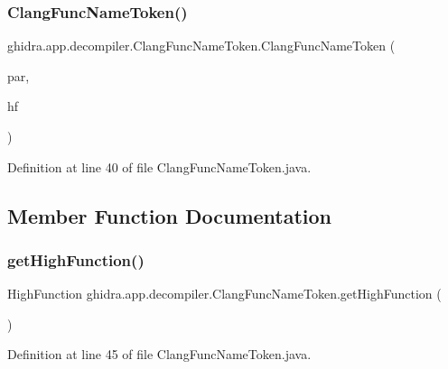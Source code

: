 \subsubsection{\texorpdfstring{ClangFuncNameToken()}{ClangFuncNameToken()}}
{\footnotesize\ttfamily ghidra.\+app.\+decompiler.\+Clang\+Func\+Name\+Token.\+Clang\+Func\+Name\+Token (\begin{DoxyParamCaption}\item[{\mbox{\hyperlink{interfaceghidra_1_1app_1_1decompiler_1_1_clang_node}{Clang\+Node}}}]{par,  }\item[{High\+Function}]{hf }\end{DoxyParamCaption})\hspace{0.3cm}{\ttfamily [inline]}}



Definition at line 40 of file Clang\+Func\+Name\+Token.\+java.



\subsection{Member Function Documentation}
\mbox{\label{classghidra_1_1app_1_1decompiler_1_1_clang_func_name_token_ab33ddfc24363949886b22462187de7d0}} 
\subsubsection{\texorpdfstring{getHighFunction()}{getHighFunction()}}
{\footnotesize\ttfamily High\+Function ghidra.\+app.\+decompiler.\+Clang\+Func\+Name\+Token.\+get\+High\+Function (\begin{DoxyParamCaption}{ }\end{DoxyParamCaption})\hspace{0.3cm}{\ttfamily [inline]}}



Definition at line 45 of file Clang\+Func\+Name\+Token.\+java.

\mbox{\label{classghidra_1_1app_1_1decompiler_1_1_clang_func_name_token_a9678bd16bf55a5da6fd12eb93488c84e}} 
